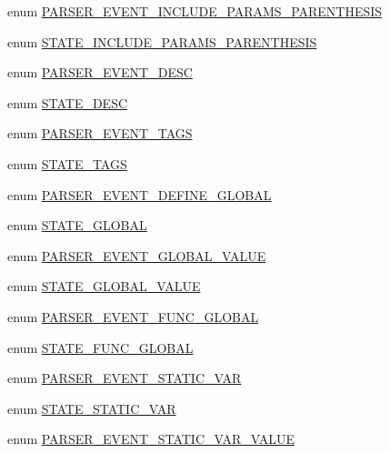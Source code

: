\begin{DoxyCompactItemize}
enum \hyperlink{_parser_8inc_a8534012b9687c9a483755fe007d8a2c2}{\-P\-A\-R\-S\-E\-R\-\_\-\-E\-V\-E\-N\-T\-\_\-\-I\-N\-C\-L\-U\-D\-E\-\_\-\-P\-A\-R\-A\-M\-S\-\_\-\-P\-A\-R\-E\-N\-T\-H\-E\-S\-I\-S} 
\item 
enum \hyperlink{_parser_8inc_a49e1ef2af76200e1c71de18870a8eef9}{\-S\-T\-A\-T\-E\-\_\-\-I\-N\-C\-L\-U\-D\-E\-\_\-\-P\-A\-R\-A\-M\-S\-\_\-\-P\-A\-R\-E\-N\-T\-H\-E\-S\-I\-S} 
\item 
enum \hyperlink{_parser_8inc_a0f643db1122f49e3a13d42191f610c97}{\-P\-A\-R\-S\-E\-R\-\_\-\-E\-V\-E\-N\-T\-\_\-\-D\-E\-S\-C} 
\item 
enum \hyperlink{_parser_8inc_a5593253cbaf8b170bd8c527b0f29ab89}{\-S\-T\-A\-T\-E\-\_\-\-D\-E\-S\-C} 
\item 
enum \hyperlink{_parser_8inc_ac2bc44956540733bb90a860889ffe60e}{\-P\-A\-R\-S\-E\-R\-\_\-\-E\-V\-E\-N\-T\-\_\-\-T\-A\-G\-S} 
\item 
enum \hyperlink{_parser_8inc_a10a5fbccb3c5183738fe19d1ef59c2cc}{\-S\-T\-A\-T\-E\-\_\-\-T\-A\-G\-S} 
\item 
enum \hyperlink{_parser_8inc_aab69c5f250064d93e3e6b877003b7ba6}{\-P\-A\-R\-S\-E\-R\-\_\-\-E\-V\-E\-N\-T\-\_\-\-D\-E\-F\-I\-N\-E\-\_\-\-G\-L\-O\-B\-A\-L} 
\item 
enum \hyperlink{_parser_8inc_ad16e0901cdae850f55b8b6a14630362d}{\-S\-T\-A\-T\-E\-\_\-\-G\-L\-O\-B\-A\-L} 
\item 
enum \hyperlink{_parser_8inc_ac28a95195a86fcb9177cc9a1ad81e704}{\-P\-A\-R\-S\-E\-R\-\_\-\-E\-V\-E\-N\-T\-\_\-\-G\-L\-O\-B\-A\-L\-\_\-\-V\-A\-L\-U\-E} 
\item 
enum \hyperlink{_parser_8inc_a1fc963162fd4626f541e578b60f0c5a6}{\-S\-T\-A\-T\-E\-\_\-\-G\-L\-O\-B\-A\-L\-\_\-\-V\-A\-L\-U\-E} 
\item 
enum \hyperlink{_parser_8inc_a92f447093cc5a08288a6c376cf0cc0a4}{\-P\-A\-R\-S\-E\-R\-\_\-\-E\-V\-E\-N\-T\-\_\-\-F\-U\-N\-C\-\_\-\-G\-L\-O\-B\-A\-L} 
\item 
enum \hyperlink{_parser_8inc_a333f78fef8bf632f9555525c947b4144}{\-S\-T\-A\-T\-E\-\_\-\-F\-U\-N\-C\-\_\-\-G\-L\-O\-B\-A\-L} 
\item 
enum \hyperlink{_parser_8inc_a415d6a7a4ac5da7fc9b37c00574d71bd}{\-P\-A\-R\-S\-E\-R\-\_\-\-E\-V\-E\-N\-T\-\_\-\-S\-T\-A\-T\-I\-C\-\_\-\-V\-A\-R} 
\item 
enum \hyperlink{_parser_8inc_a567e1294f489a07f5c682a4231fa7bcf}{\-S\-T\-A\-T\-E\-\_\-\-S\-T\-A\-T\-I\-C\-\_\-\-V\-A\-R} 
\item 
enum \hyperlink{_parser_8inc_ae790f4d570135e925eae56dbd18daafc}{\-P\-A\-R\-S\-E\-R\-\_\-\-E\-V\-E\-N\-T\-\_\-\-S\-T\-A\-T\-I\-C\-\_\-\-V\-A\-R\-\_\-\-V\-A\-L\-U\-E} 

\end{DoxyCompactItemize}
